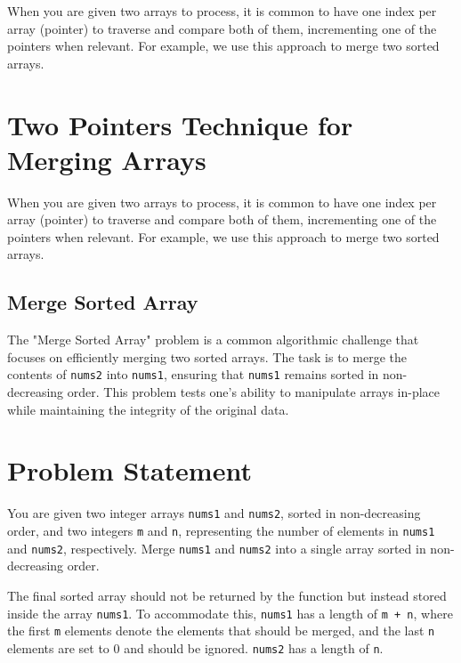 
When you are given two arrays to process, it is common to have one index per array (pointer) to traverse and compare both of them, incrementing one of the pointers when relevant. For example, we use this approach to merge two sorted arrays.
\section*{Two Pointers Technique for Merging Arrays}

When you are given two arrays to process, it is common to have one index per array (pointer) to traverse and compare both of them, incrementing one of the pointers when relevant. For example, we use this approach to merge two sorted arrays.

\subsection{Merge Sorted Array}
\label{subsec:Merge_Sorted_Array}

The "Merge Sorted Array" problem is a common algorithmic challenge that focuses on efficiently merging two sorted arrays. The task is to merge the contents of \texttt{nums2} into \texttt{nums1}, ensuring that \texttt{nums1} remains sorted in non-decreasing order. This problem tests one's ability to manipulate arrays in-place while maintaining the integrity of the original data.

\section*{Problem Statement}

You are given two integer arrays \texttt{nums1} and \texttt{nums2}, sorted in non-decreasing order, and two integers \texttt{m} and \texttt{n}, representing the number of elements in \texttt{nums1} and \texttt{nums2}, respectively. Merge \texttt{nums1} and \texttt{nums2} into a single array sorted in non-decreasing order.

The final sorted array should not be returned by the function but instead stored inside the array \texttt{nums1}. To accommodate this, \texttt{nums1} has a length of \texttt{m + n}, where the first \texttt{m} elements denote the elements that should be merged, and the last \texttt{n} elements are set to 0 and should be ignored. \texttt{nums2} has a length of \texttt{n}.

